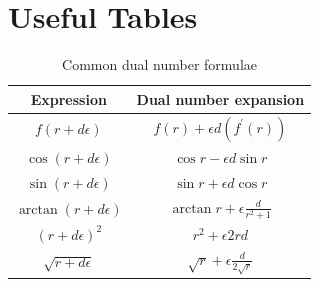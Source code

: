 %
%
%
%
%

\section{Useful Tables}

\label{sec:Tables}

\begin{table}[ht]
\caption{Common dual number formulae}
\label{tab:dual_trig_functions}
\bgroup
\def\arraystretch{1.5}
\begin{tabular}{cc}
	\toprule
	Expression & Dual number expansion \\
	\midrule
	$f\left(r+d\epsilon\right)$ & $f\left(r\right)+\epsilon d\left(f^{\prime}\left(r\right)\right)$ \\
	$\cos\left(r+d\epsilon\right)$ & $\cos r-\epsilon d\sin r$ \\
	$\sin\left(r+d\epsilon\right)$ & $\sin r+\epsilon d\cos r$ \\
	$\arctan\left(r+d\epsilon\right)$ & $\arctan r+\epsilon\frac{d}{r^{2}+1}$ \\
	$\left(r+d\epsilon\right)^{2}$ & $r^{2}+\epsilon 2 r d$ \\
	$\sqrt{r+d\epsilon}$ & $\sqrt{r}+\epsilon\frac{d}{2\sqrt{r}}$ \\
	\bottomrule
\end{tabular}
\egroup
\end{table}

